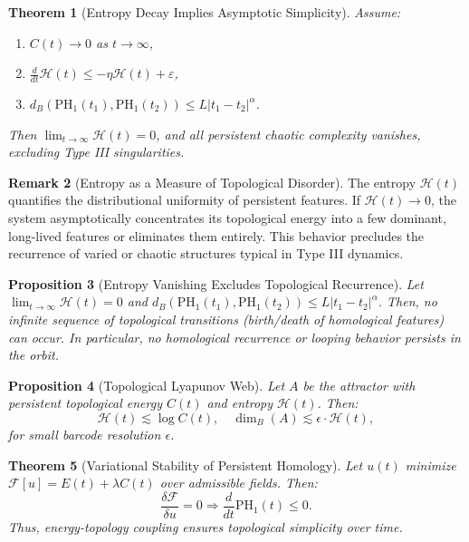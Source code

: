\documentclass[11pt]{article}
\newtheorem{theorem}{Theorem}[section]
\newtheorem{proposition}[theorem]{Proposition}
\theoremstyle{definition}
\newtheorem{remark}[theorem]{Remark}
\begin{document}
\begin{theorem}[Entropy Decay Implies Asymptotic Simplicity]
Assume:
\begin{enumerate}
    \item $C(t) \to 0$ as $t \to \infty$,
    \item $\frac{d}{dt} \mathcal{H}(t) \le -\eta \mathcal{H}(t) + \varepsilon$,
    \item $d_B(\mathrm{PH}_1(t_1), \mathrm{PH}_1(t_2)) \le L|t_1 - t_2|^\alpha$.
\end{enumerate}
Then $\lim_{t \to \infty} \mathcal{H}(t) = 0$, and all persistent chaotic complexity vanishes, excluding Type III singularities.
\end{theorem}

\begin{remark}[Entropy as a Measure of Topological Disorder]
The entropy $\mathcal{H}(t)$ quantifies the distributional uniformity of persistent features. If $\mathcal{H}(t) \to 0$, the system asymptotically concentrates its topological energy into a few dominant, long-lived features or eliminates them entirely. This behavior precludes the recurrence of varied or chaotic structures typical in Type III dynamics.
\end{remark}

\begin{proposition}[Entropy Vanishing Excludes Topological Recurrence]
Let $\lim_{t \to \infty} \mathcal{H}(t) = 0$ and $d_B(\mathrm{PH}_1(t_1), \mathrm{PH}_1(t_2)) \le L |t_1 - t_2|^\alpha$. Then, no infinite sequence of topological transitions (birth/death of homological features) can occur. In particular, no homological recurrence or looping behavior persists in the orbit.
\end{proposition}

\begin{proposition}[Topological Lyapunov Web]
Let $A$ be the attractor with persistent topological energy $C(t)$ and entropy $\mathcal{H}(t)$. Then:
\[
\mathcal{H}(t) \lesssim \log C(t), \quad \dim_B(A) \lesssim \epsilon \cdot \mathcal{H}(t),
\]
for small barcode resolution $\epsilon$.
\end{proposition}

\begin{theorem}[Variational Stability of Persistent Homology]
Let $u(t)$ minimize $\mathcal{F}[u] = E(t) + \lambda C(t)$ over admissible fields. Then:
\[
\frac{\delta \mathcal{F}}{\delta u} = 0 \Rightarrow \frac{d}{dt} \mathrm{PH}_1(t) \le 0.
\]
Thus, energy-topology coupling ensures topological simplicity over time.
\end{theorem}
\end{document}
